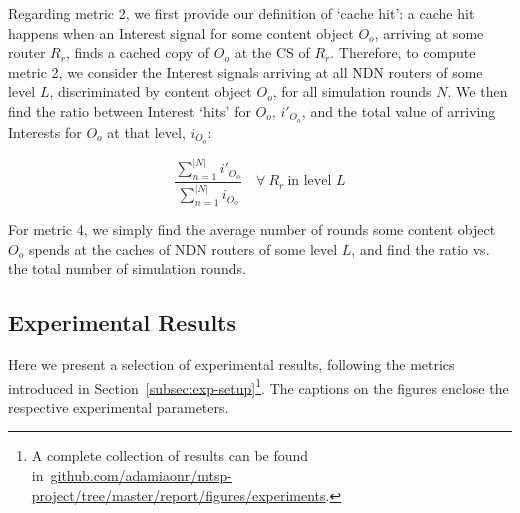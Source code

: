 Regarding metric 2, we first provide our definition of `cache hit': a cache hit 
happens when an Interest signal for some content object $O_o$, arriving at some 
router $R_r$, finds a cached copy of $O_o$ at the CS of $R_r$. Therefore, to 
compute metric 2, we consider the Interest signals 
arriving at all NDN routers of some level $L$, discriminated by content 
object $O_o$, for all simulation rounds $N$. We then find the ratio between Interest 
`hits' for $O_o$, $i'_{O_o}$, and the total value of arriving Interests for $O_o$ at that 
level, $i_{O_o}$:

\begin{equation}
    \frac{\sum_{n=1}^{|N|} i'_{O_o}}{\sum_{n=1}^{|N|} i_{O_o}} \quad \forall \ R_r \ \text{in level $L$}
    \label{eq:exp-setup-metrics-2}
\end{equation}\shortvertbreak

For metric 4, we simply find the average number of rounds 
some content object $O_o$ spends at the caches of NDN routers of some level $L$, and find 
the ratio vs. the total number of simulation rounds.

\subsection{Experimental Results}
\label{subsec:exp-results}

Here we present a selection of experimental results, following the metrics 
introduced in Section~\ref{subsec:exp-setup}\footnote{A complete collection of 
results can be found in~\url{github.com/adamiaonr/mtsp-project/tree/master/report/figures/experiments}.}. 
The captions on the figures enclose the respective experimental parameters.\shortvertbreak


